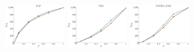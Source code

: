 \documentclass[a4paper]{report}
\newcommand{\wratio}{0.195}
\begin{document}
\includegraphics[width=\wratio\textwidth]{influence/PGP/fs_pgp}\hfill
\includegraphics[width=\wratio\textwidth]{influence/PHD/fs_phd}\hfill
\includegraphics[width=\wratio\textwidth]{influence/POWER_GRID/fs_power_grid}\hfill
\end{document}
